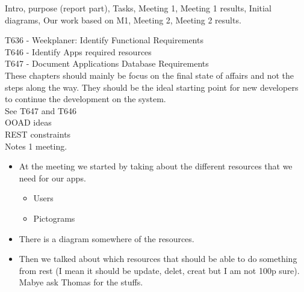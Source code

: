 Intro, purpose (report part), Tasks, Meeting 1, Meeting 1 results, Initial
diagrams, Our work based on M1, Meeting 2, Meeting 2 results.




T636 - Weekplaner: Identify Functional Requirements\\
T646 - Identify Apps required resources\\
T647 - Document Applications Database Requirements\\


These chapters should mainly be focus on the final state of affairs and not the
steps along the way. They should be the ideal starting point for new developers
to continue the development on the system.\\


See T647 and T646\\
OOAD ideas\\
REST constraints\\

Notes 1 meeting.\\
\begin{itemize}
  \item At the meeting we started by taking about the different resources that we need
for our apps.
\begin{itemize}
  \item Users
  \item Pictograms
\end{itemize}
\item There is a diagram somewhere of the resources.
\item Then we talked about which resources that should be able to do something
from rest (I mean it should be update, delet, creat but I am not 100p sure).
Mabye ask Thomas for the stuffs.
\end{itemize}

